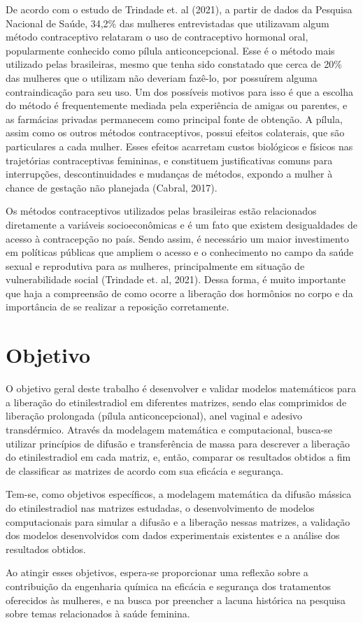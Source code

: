 De acordo com o estudo de Trindade et. al (2021), a partir de dados da Pesquisa Nacional de Saúde, 34,2\% das mulheres entrevistadas que utilizavam algum método contraceptivo relataram o uso de contraceptivo hormonal oral, popularmente conhecido como pílula anticoncepcional. Esse é o método mais utilizado pelas brasileiras, mesmo que tenha sido constatado que cerca de 20\% das mulheres que o utilizam não deveriam fazê-lo, por possuírem alguma contraindicação para seu uso. Um dos possíveis motivos para isso é que a escolha do método é frequentemente mediada pela experiência de amigas ou parentes, e as farmácias privadas permanecem como principal fonte de obtenção. A pílula, assim como os outros métodos contraceptivos, possui efeitos colaterais, que são particulares a cada mulher. Esses efeitos acarretam custos biológicos e físicos nas trajetórias contraceptivas femininas, e constituem justificativas comuns para interrupções, descontinuidades e mudanças de métodos, expondo a mulher à chance de gestação não planejada (Cabral, 2017).

Os métodos contraceptivos utilizados pelas brasileiras estão relacionados diretamente a variáveis socioeconômicas e é um fato que existem desigualdades de acesso à contracepção no país. Sendo assim, é necessário um maior investimento em políticas públicas que ampliem o acesso e o conhecimento no campo da saúde sexual e reprodutiva para as mulheres, principalmente em situação de vulnerabilidade social (Trindade et. al, 2021). Dessa forma, é muito importante que haja a compreensão de como ocorre a liberação dos hormônios no corpo e da importância de se realizar a reposição corretamente. 

\section{Objetivo}\label{sec:goal}

O objetivo geral deste trabalho é desenvolver e validar modelos matemáticos para a liberação do etinilestradiol em diferentes matrizes, sendo elas comprimidos de liberação prolongada (pílula anticoncepcional), anel vaginal e adesivo transdérmico. Através da modelagem matemática e computacional, busca-se utilizar princípios de difusão e transferência de massa para descrever a liberação do etinilestradiol em cada matriz, e, então, comparar os resultados obtidos a fim de classificar as matrizes de acordo com sua eficácia e segurança.

Tem-se, como objetivos específicos, a modelagem matemática da difusão mássica do etinilestradiol nas matrizes estudadas, o desenvolvimento de modelos computacionais para simular a difusão e a liberação nessas matrizes, a validação dos modelos desenvolvidos com dados experimentais existentes e a análise dos resultados obtidos.

Ao atingir esses objetivos, espera-se proporcionar uma reflexão sobre a contribuição da engenharia química na eficácia e segurança dos tratamentos oferecidos às mulheres, e na busca por preencher a lacuna histórica na pesquisa sobre temas relacionados à saúde feminina.